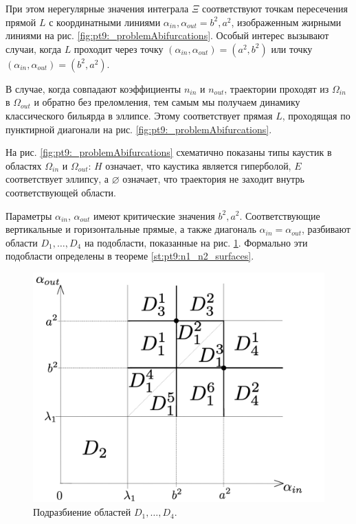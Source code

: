 

При этом нерегулярные значения интеграла $\Xi$ соответствуют точкам пересечения  прямой $L$ с координатными линиями $\alpha_{in},\alpha_{out} = b^2, a^2$, изображенным жирными линиями на рис. \ref{fig:pt9:_problemAbifurcations}.
Особый интерес вызывают случаи, когда $L$ проходит через точку $(\alpha_{in}, \alpha_{out}) = (a^2, b^2)$ или точку  $(\alpha_{in}, \alpha_{out}) = (b^2, a^2)$.
\begin{remark}
В случае, когда совпадают коэффициенты $n_{in}$ и $n_{out}$, траектории проходят из $\Omega_{in}$ в $\Omega_{out}$ и обратно без преломления, тем самым мы получаем динамику классического бильярда в эллипсе. Этому соответствует прямая $L$, проходящая по пунктирной диагонали на рис. \ref{fig:pt9:_problemAbifurcations}.

На рис. \ref{fig:pt9:_problemAbifurcations} схематично показаны типы каустик в областях $\Omega_{in}$ и $\Omega_{out}$:  $H$ означает, что каустика является гиперболой, $E$ соответствует эллипсу, а $\varnothing$ означает, что траектория не заходит внутрь соответствующей области. 
\label{rem:remark1}
\end{remark}

Параметры  $\alpha_{in}$, $\alpha_{out}$ имеют критические значения $b^2, a^2$. Соответствующие вертикальные и горизонтальные прямые, а также диагональ $\alpha_{in} = \alpha_{out}$, разбивают области $D_1, \ldots, D_4$ на подобласти, показанные на рис. \ref{fig:pt9:_problemA_subdivisions}. Формально эти подобласти определены в теореме \ref{st:pt9:n1_n2_surfaces}.
\begin{figure}[!htb]
\centering
\includegraphics[scale=0.1]{images/section2/problemA_subdivisions.pdf}
    \caption{Подразбиение областей $D_1, \ldots, D_4$.}
    \label{fig:pt9:_problemA_subdivisions}
\end{figure}

